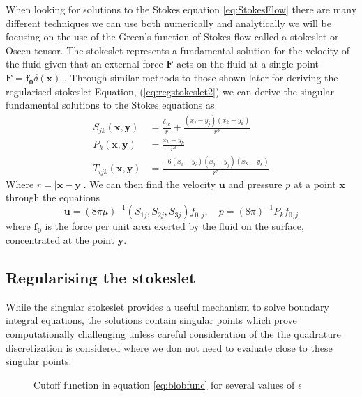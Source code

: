 When looking for solutions to the Stokes equation \cref{eq:StokesFlow} there are many different techniques we can use both numerically and analytically we will be focusing on the use of the Green's function of Stokes flow called a stokeslet\cite{Pozrikidis1992BoundaryFlow,Hancock1953TheLiquids} or Oseen tensor\cite{Oseen1927NeuereHydrodynamik}. The stokeslet represents a fundamental solution for the velocity of the fluid given that an external force $\bm{F}$ acts on the fluid at a single point $\bm{F} = \bm{f_0}\delta(\bm{x})$ \cite{Hancock1953TheLiquids, Batchelor2000AnDynamics}.
Through similar methods to those shown later for deriving the regularised stokeslet Equation, (\cref{eq:regstokeslet2}) we can derive the singular fundamental solutions to the Stokes equations as
\begin{equation}
\label{eq:singularsolutions}
\begin{aligned}
    S_{j k}(\bm{x}, \bm{y}) &= \frac{\delta_{j k}}{r}+\frac{\left(x_{j}-y_{j}\right)\left(x_{k}-y_{k}\right)}{r^{3}} \\
    P_{k}(\bm{x}, \bm{y}) &= \frac{x_{k}-y_{k}}{r^{3}} \\
    T_{ijk}(\bm{x}, \bm{y}) &= \frac{-6\left(x_{i}-y_{i}\right)\left(x_{j}-y_{j}\right)\left(x_{k}-y_{k}\right)}{r^5}
\end{aligned}
\end{equation}
Where $r=|\bm{x}-\bm{y}|$. We can then find the velocity $\bm{u}$ and pressure $p$ at a point $\bm{x}$ through the equations
\begin{equation*}
    \bm{u} = (8 \pi \mu)^{-1} \left(S_{1j},S_{2j},S_{3j}\right)f_{0,j}, \quad p = (8 \pi)^{-1} P_k f_{0,j} 
\end{equation*}
where $\bm{f_{0}}$ is the force per unit area exerted by the fluid on the surface, concentrated at the point $\bm{y}$.


\subsection{Regularising the stokeslet}
While the singular stokeslet provides a useful mechanism to solve boundary integral equations, the solutions contain singular points which prove computationally challenging unless careful consideration of the the quadrature discretization is considered where we don not need to evaluate close to these singular points.

\begin{figure}[ht]
    \centering
    \resizebox{.6\linewidth}{!}{}
    \caption{Cutoff function in equation \cref{eq:blobfunc} for several values of $\epsilon$}
    \label{fig:blobfunc}
\end{figure}

